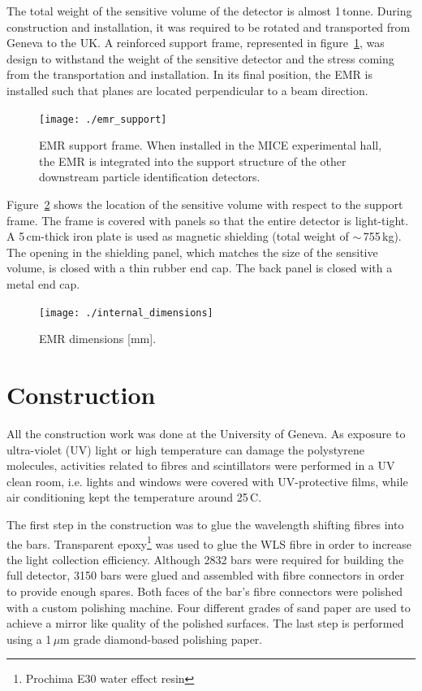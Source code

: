\documentclass[a4paper,11pt]{article}
\begin{document}
The total weight of the sensitive volume of the detector is almost 1\,tonne. During construction and installation, it was required to be rotated and
transported from Geneva to the UK. A reinforced support frame, represented in figure~\ref{fig:emr_support}, was design to withstand the weight of the
sensitive detector and the stress coming from the transportation and installation. In its final position, the EMR is installed such that planes are
located perpendicular to a beam direction. 

\begin{figure}[htp!]
 \centering 
 \texttt{[image: ./emr\_support]}
 \caption[EMR support frame]{EMR support frame. When installed in the MICE experimental hall, the EMR is integrated into the support structure of the other 
 downstream particle identification detectors.}
 \label{fig:emr_support}
\end{figure}

Figure~\ref{fig:internal_dimensions} shows the location of the sensitive volume with respect to the support frame. The frame is covered with panels so that
the entire detector is light-tight. A 5\,cm-thick iron plate is used as magnetic shielding (total weight of $\sim\,$755\,kg). The opening in the shielding
panel, which matches the size of the sensitive volume, is closed with a thin rubber end cap. The back panel is closed with a metal end cap.

\begin{figure}[htp!]
 \centering
 \texttt{[image: ./internal\_dimensions]}
 \caption[EMR dimensions]{EMR dimensions [mm].}
 \label{fig:internal_dimensions}
\end{figure}

\section{Construction}\label{sec:construction}

All the construction work was done at the University of Geneva. As exposure to ultra-violet (UV) light or high temperature can damage the polystyrene
molecules, activities related to fibres and scintillators were performed in a UV clean room, i.e. lights and windows were covered with UV-protective
films, while air conditioning kept the temperature around 25\,\degree C. 

The first step in the construction was to glue the wavelength shifting fibres
into the bars. Transparent epoxy\footnote{Prochima E30 water effect resin} was used to glue the WLS fibre in order to increase the light collection
efficiency. Although 2832 bars were required for building the full detector, 3150 bars were glued and assembled with fibre connectors in
order to provide enough spares. Both faces of the bar's fibre connectors were polished with a custom polishing machine. Four
different grades of sand paper are used to achieve a mirror like quality of the polished surfaces. The last step is performed using a 1\,$\mu$m grade
diamond-based polishing paper.
\end{document}
